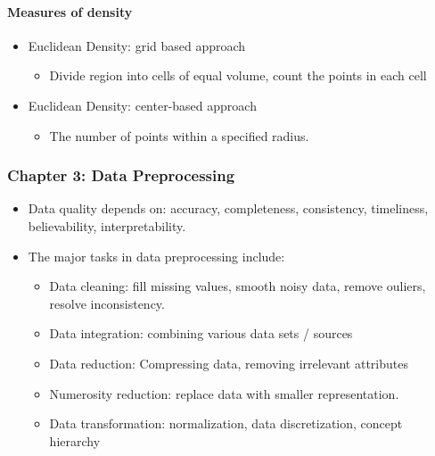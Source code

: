 \documentclass[11pt]{article}
\providecommand{\tightlist}{%
      \setlength{\itemsep}{0pt}\setlength{\parskip}{0pt}}
\begin{document}
    \paragraph{Measures of density}\label{measures-of-density}

    \begin{itemize}
\tightlist
\item
  Euclidean Density: grid based approach

  \begin{itemize}
  \tightlist
  \item
    Divide region into cells of equal volume, count the points in each
    cell
  \end{itemize}
\item
  Euclidean Density: center-based approach

  \begin{itemize}
  \tightlist
  \item
    The number of points within a specified radius.
  \end{itemize}
\end{itemize}

    \subsubsection{Chapter 3: Data
Preprocessing}\label{chapter-3-data-preprocessing}

    \begin{itemize}
\tightlist
\item
  Data quality depends on: accuracy, completeness, consistency,
  timeliness, believability, interpretability.
\item
  The major tasks in data preprocessing include:

  \begin{itemize}
  \tightlist
  \item
    Data cleaning: fill missing values, smooth noisy data, remove
    ouliers, resolve inconsistency.
  \item
    Data integration: combining various data sets / sources
  \item
    Data reduction: Compressing data, removing irrelevant attributes
  \item
    Numerosity reduction: replace data with smaller representation.
  \item
    Data transformation: normalization, data discretization, concept
    hierarchy
  \end{itemize}
\end{itemize}
\end{document}
